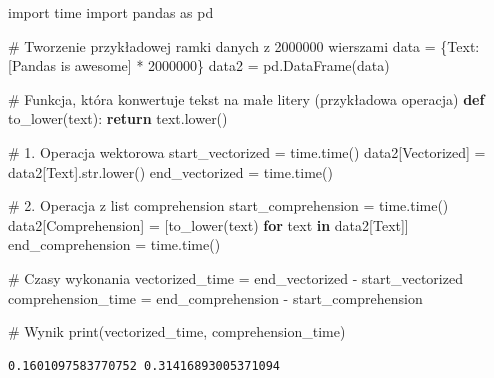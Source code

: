 \documentclass[
  polish,
  letterpaper,
  DIV=11,
  numbers=noendperiod]{scrreprt}
\newenvironment{Shaded}{\begin{snugshade}}{\end{snugshade}}
\newcommand{\BuiltInTok}[1]{\textcolor[rgb]{0.00,0.23,0.31}{#1}}
\newcommand{\CommentTok}[1]{\textcolor[rgb]{0.37,0.37,0.37}{#1}}
\newcommand{\ControlFlowTok}[1]{\textcolor[rgb]{0.00,0.23,0.31}{\textbf{#1}}}
\newcommand{\DecValTok}[1]{\textcolor[rgb]{0.68,0.00,0.00}{#1}}
\newcommand{\ImportTok}[1]{\textcolor[rgb]{0.00,0.46,0.62}{#1}}
\newcommand{\KeywordTok}[1]{\textcolor[rgb]{0.00,0.23,0.31}{\textbf{#1}}}
\newcommand{\NormalTok}[1]{\textcolor[rgb]{0.00,0.23,0.31}{#1}}
\newcommand{\OperatorTok}[1]{\textcolor[rgb]{0.37,0.37,0.37}{#1}}
\newcommand{\StringTok}[1]{\textcolor[rgb]{0.13,0.47,0.30}{#1}}
\begin{document}
\begin{Shaded}
\begin{Highlighting}[]
\ImportTok{import}\NormalTok{ time}
\ImportTok{import}\NormalTok{ pandas }\ImportTok{as}\NormalTok{ pd}

\CommentTok{\# Tworzenie przykładowej ramki danych z 2000000 wierszami}
\NormalTok{data }\OperatorTok{=}\NormalTok{ \{}\StringTok{\textquotesingle{}Text\textquotesingle{}}\NormalTok{: [}\StringTok{\textquotesingle{}Pandas is awesome\textquotesingle{}}\NormalTok{] }\OperatorTok{*} \DecValTok{2000000}\NormalTok{\}}
\NormalTok{data2 }\OperatorTok{=}\NormalTok{ pd.DataFrame(data)}


\CommentTok{\# Funkcja, która konwertuje tekst na małe litery (przykładowa operacja)}
\KeywordTok{def}\NormalTok{ to\_lower(text):}
    \ControlFlowTok{return}\NormalTok{ text.lower()}


\CommentTok{\# 1. Operacja wektorowa}
\NormalTok{start\_vectorized }\OperatorTok{=}\NormalTok{ time.time()}
\NormalTok{data2[}\StringTok{\textquotesingle{}Vectorized\textquotesingle{}}\NormalTok{] }\OperatorTok{=}\NormalTok{ data2[}\StringTok{\textquotesingle{}Text\textquotesingle{}}\NormalTok{].}\BuiltInTok{str}\NormalTok{.lower()}
\NormalTok{end\_vectorized }\OperatorTok{=}\NormalTok{ time.time()}

\CommentTok{\# 2. Operacja z list comprehension}
\NormalTok{start\_comprehension }\OperatorTok{=}\NormalTok{ time.time()}
\NormalTok{data2[}\StringTok{\textquotesingle{}Comprehension\textquotesingle{}}\NormalTok{] }\OperatorTok{=}\NormalTok{ [to\_lower(text) }\ControlFlowTok{for}\NormalTok{ text }\KeywordTok{in}\NormalTok{ data2[}\StringTok{\textquotesingle{}Text\textquotesingle{}}\NormalTok{]]}
\NormalTok{end\_comprehension }\OperatorTok{=}\NormalTok{ time.time()}

\CommentTok{\# Czasy wykonania}
\NormalTok{vectorized\_time }\OperatorTok{=}\NormalTok{ end\_vectorized }\OperatorTok{{-}}\NormalTok{ start\_vectorized}
\NormalTok{comprehension\_time }\OperatorTok{=}\NormalTok{ end\_comprehension }\OperatorTok{{-}}\NormalTok{ start\_comprehension}

\CommentTok{\# Wynik}
\BuiltInTok{print}\NormalTok{(vectorized\_time, comprehension\_time)}
\end{Highlighting}
\end{Shaded}

\begin{verbatim}
0.1601097583770752 0.31416893005371094
\end{verbatim}
\end{document}
